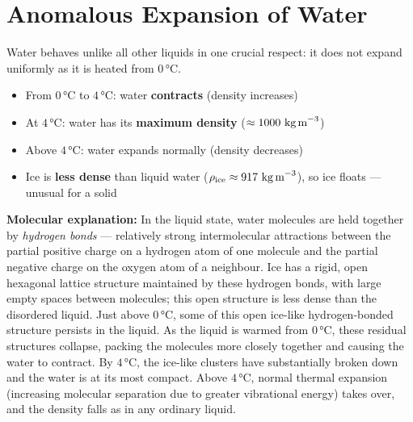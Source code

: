 \section{Anomalous Expansion of Water}

Water behaves unlike all other liquids in one crucial
respect: it does not expand uniformly as it is heated
from $0\,°\text{C}$.

\begin{processbox}
\begin{itemize}[noitemsep]
  \item From $0\,°\text{C}$ to $4\,°\text{C}$: water
  \textbf{contracts} (density increases)
  \item At $4\,°\text{C}$: water has its
  \textbf{maximum density}
  ($\approx 1000\ \text{kg\,m}^{-3}$)
  \item Above $4\,°\text{C}$: water expands normally
  (density decreases)
  \item Ice is \textbf{less dense} than liquid water
  ($\rho_{\text{ice}} \approx 917\ \text{kg\,m}^{-3}$),
  so ice floats --- unusual for a solid
\end{itemize}
\textbf{Molecular explanation:} In the liquid state,
water molecules are held together by \textit{hydrogen
bonds} --- relatively strong intermolecular
attractions between the partial positive charge on a
hydrogen atom of one molecule and the partial negative
charge on the oxygen atom of a neighbour. Ice has a
rigid, open hexagonal lattice structure maintained by
these hydrogen bonds, with large empty spaces between
molecules; this open structure is less dense than the
disordered liquid. Just above $0\,°\text{C}$, some of
this open ice-like hydrogen-bonded structure persists
in the liquid. As the liquid is warmed from
$0\,°\text{C}$, these residual structures collapse,
packing the molecules more closely together and
causing the water to contract. By $4\,°\text{C}$, the
ice-like clusters have substantially broken down and
the water is at its most compact. Above $4\,°\text{C}$,
normal thermal expansion (increasing molecular
separation due to greater vibrational energy) takes
over, and the density falls as in any ordinary liquid.
\end{processbox}

